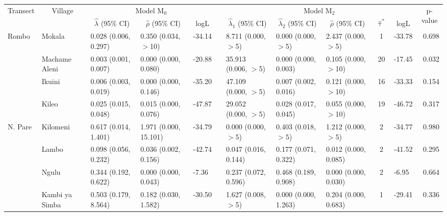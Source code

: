 \begin{tabular}{lllllllllclr} 
\toprule
\multicolumn{1}{c}{\multirow{2}{*}{Transect}} & \multicolumn{1}{c}{\multirow{2}{*}{Village}} & \multicolumn{3}{c}{Model M$_0$} & \multicolumn{1}{c}{} & \multicolumn{5}{c}{Model M$_2$} & \multicolumn{1}{c}{\multirow{2}{*}{p-value}}  \\ 
\cmidrule{3-5}\cmidrule{7-11}
\multicolumn{1}{c}{} & \multicolumn{1}{c}{} & \multicolumn{1}{c}{$\hat{\lambda}$ (95\% CI)} & \multicolumn{1}{c}{$\hat{\rho}$ (95\% CI)} & \multicolumn{1}{c}{logL} & \multicolumn{1}{c}{} & \multicolumn{1}{c}{$\hat{\lambda}_1$ (95\% CI)} & \multicolumn{1}{c}{$\hat{\lambda}_2$ (95\% CI)} & \multicolumn{1}{c}{$\hat{\rho}$ (95\% CI)} & \multicolumn{1}{c}{$\hat{\uptau}^*$} & \multicolumn{1}{c}{logL} & \multicolumn{1}{c}{} \\ 
\midrule
Rombo       & Mokala         & 0.028 (0.006, 0.297)   & 0.350 (0.034, $>$10)   & -34.14   & & 8.711 (0.000, $>$5)  & 0.000 (0.000, $>$5)    & 2.437 (0.000, $>$5)    & 1   & -33.78   & 0.698 \\
            & Machame Aleni  & 0.003 (0.001, 0.007)   & 0.000 (0.000, 0.080)   & -20.88   & & 35.913 (0.006, $>$5) & 0.000 (0.000, 0.003)   & 0.105 (0.000, $>$10)   & 20  & -17.45   & 0.032 \\
            & Ikuini         & 0.006 (0.003, 0.019)   & 0.000 (0.000, 0.146)   & -35.20   & & 47.109 (0.000, $>$5) & 0.007 (0.002, 0.016)   & 0.121 (0.000, $>$10)   & 16  & -33.33   & 0.154 \\
            & Kileo          & 0.025 (0.015, 0.048)   & 0.015 (0.000, 0.076)   & -47.87   & & 29.052 (0.000, $>$5) & 0.028 (0.017, 0.045)   & 0.055 (0.000, $>$10)   & 19  & -46.72   & 0.317 \\
\cmidrule{2-12}
N. Pare     & Kilomeni       & 0.617 (0.014, 1.401)   & 1.971 (0.000, 15.101)  & -34.79   & & 0.000 (0.000, $>$5)  & 0.403 (0.018, $>$5)    & 1.212 (0.000, $>$5)    & 2   & -34.77   & 0.980 \\
            & Lambo          & 0.098 (0.056, 0.232)   & 0.036 (0.002, 0.156)   & -42.74   & & 0.047 (0.016, 0.144) & 0.177 (0.071, 0.322)   & 0.012 (0.000, 0.085)   & 2   & -41.52   & 0.295 \\
            & Ngulu          & 0.344 (0.192, 0.622)   & 0.000 (0.000, 0.043)   & -7.36    & & 0.237 (0.072, 0.596) & 0.468 (0.189, 0.908)   & 0.000 (0.000, 0.030)   & 2   & -6.95    & 0.664 \\
            & Kambi ya Simba & 0.503 (0.179, 8.564)   & 0.182 (0.030, 1.582)   & -30.50   & & 1.627 (0.008, $>$5)  & 0.000 (0.000, 1.263)   & 0.204 (0.000, 0.683)   & 1   & -29.41   & 0.336 \\

\end{tabular}

